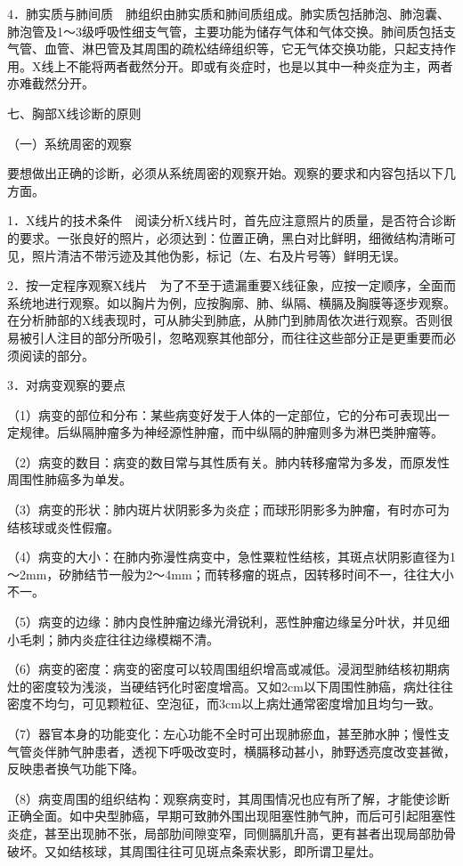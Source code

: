 4．肺实质与肺间质　肺组织由肺实质和肺间质组成。肺实质包括肺泡、肺泡囊、肺泡管及1～3级呼吸性细支气管，主要功能为储存气体和气体交换。肺间质包括支气管、血管、淋巴管及其周围的疏松结缔组织等，它无气体交换功能，只起支持作用。X线上不能将两者截然分开。即或有炎症时，也是以其中一种炎症为主，两者亦难截然分开。

七、胸部X线诊断的原则

（一）系统周密的观察

要想做出正确的诊断，必须从系统周密的观察开始。观察的要求和内容包括以下几方面。

1．X线片的技术条件　阅读分析X线片时，首先应注意照片的质量，是否符合诊断的要求。一张良好的照片，必须达到：位置正确，黑白对比鲜明，细微结构清晰可见，照片清洁不带污迹及其他伪影，标记（左、右及片号等）鲜明无误。

2．按一定程序观察X线片　为了不至于遗漏重要X线征象，应按一定顺序，全面而系统地进行观察。如以胸片为例，应按胸廓、肺、纵隔、横膈及胸膜等逐步观察。在分析肺部的X线表现时，可从肺尖到肺底，从肺门到肺周依次进行观察。否则很易被引人注目的部分所吸引，忽略观察其他部分，而往往这些部分正是更重要而必须阅读的部分。

3．对病变观察的要点

（1）病变的部位和分布：某些病变好发于人体的一定部位，它的分布可表现出一定规律。后纵隔肿瘤多为神经源性肿瘤，而中纵隔的肿瘤则多为淋巴类肿瘤等。

（2）病变的数目：病变的数目常与其性质有关。肺内转移瘤常为多发，而原发性周围性肺癌多为单发。

（3）病变的形状：肺内斑片状阴影多为炎症；而球形阴影多为肿瘤，有时亦可为结核球或炎性假瘤。

（4）病变的大小：在肺内弥漫性病变中，急性粟粒性结核，其斑点状阴影直径为1～2mm，矽肺结节一般为2～4mm；而转移瘤的斑点，因转移时间不一，往往大小不一。

（5）病变的边缘：肺内良性肿瘤边缘光滑锐利，恶性肿瘤边缘呈分叶状，并见细小毛刺；肺内炎症往往边缘模糊不清。

（6）病变的密度：病变的密度可以较周围组织增高或减低。浸润型肺结核初期病灶的密度较为浅淡，当硬结钙化时密度增高。又如2cm以下周围性肺癌，病灶往往密度不均匀，可见颗粒征、空泡征，而3cm以上病灶通常密度增加且均匀一致。

（7）器官本身的功能变化：左心功能不全时可出现肺瘀血，甚至肺水肿；慢性支气管炎伴肺气肿患者，透视下呼吸改变时，横膈移动甚小，肺野透亮度改变甚微，反映患者换气功能下降。

（8）病变周围的组织结构：观察病变时，其周围情况也应有所了解，才能使诊断正确全面。如中央型肺癌，早期可致肺外围出现阻塞性肺气肿，而后可引起阻塞性炎症，甚至出现肺不张，局部肋间隙变窄，同侧膈肌升高，更有甚者出现局部肋骨破坏。又如结核球，其周围往往可见斑点条索状影，即所谓卫星灶。

